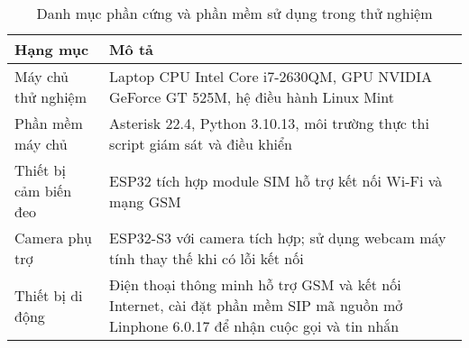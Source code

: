 \begin{table}[H]
\centering
\caption{Danh mục phần cứng và phần mềm sử dụng trong thử nghiệm}
\label{tab:hardware_software_setup}
\begin{tabular}{|l|p{10cm}|}
\hline
\textbf{Hạng mục} & \textbf{Mô tả} \\
\hline
Máy chủ thử nghiệm & Laptop CPU Intel Core i7-2630QM, GPU NVIDIA GeForce GT 525M, hệ điều hành Linux Mint \\
\hline
Phần mềm máy chủ & Asterisk 22.4, Python 3.10.13, môi trường thực thi script giám sát và điều khiển \\
\hline
Thiết bị cảm biến đeo & ESP32 tích hợp module SIM hỗ trợ kết nối Wi-Fi và mạng GSM \\
\hline
Camera phụ trợ & ESP32-S3 với camera tích hợp; sử dụng webcam máy tính thay thế khi có lỗi kết nối \\
\hline
Thiết bị di động & Điện thoại thông minh hỗ trợ GSM và kết nối Internet, cài đặt phần mềm SIP mã nguồn mở Linphone 6.0.17 để nhận cuộc gọi và tin nhắn \\
\hline
\end{tabular}
\end{table}

